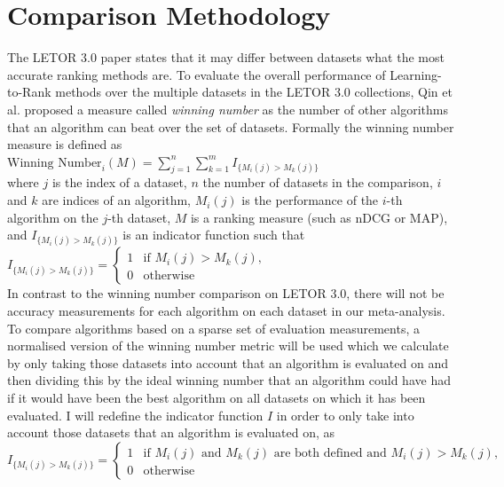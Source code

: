 \section{Comparison Methodology}
The LETOR 3.0 paper \cite{Qin2010} states that it may differ between datasets what the most accurate ranking methods are. To evaluate the overall performance of Learning-to-Rank methods over the multiple datasets in the LETOR 3.0 collections, Qin et al. \cite{Qin2010} proposed a measure called \emph{winning number} as the number of other algorithms that an algorithm can beat over the set of datasets. Formally the winning number measure is defined as\\

$\text{Winning Number}_i(M) = \sum\nolimits_{j=1}^n \sum\nolimits_{k=1}^m I_{\{M_i(j)>M_k(j)\}}$\\

where $j$ is the index of a dataset, $n$ the number of datasets in the comparison, $i$ and $k$ are indices of an algorithm, $M_i(j)$ is the performance of the $i$-th algorithm on the $j$-th dataset, $M$ is a ranking measure (such as \ac{nDCG} or \ac{MAP}), and $I_{\{M_i(j)>M_k(j)\}}$ is an indicator function such that\\

$I_{\{M_i(j)>M_k(j)\}} = \begin{cases}
1 & \text{if } M_i(j) > M_k(j), \\
0 & \text{otherwise}
\end{cases}$\\

In contrast to the winning number comparison on LETOR 3.0, there will not be accuracy measurements for each algorithm on each dataset in our meta-analysis. To compare algorithms based on a sparse set of evaluation measurements, a normalised version of the winning number metric will be used which we calculate by only taking those datasets into account that an algorithm is evaluated on and then dividing this by the ideal winning number that an algorithm could have had if it would have been the best algorithm on all datasets on which it has been evaluated. I will redefine the indicator function $I$ in order to only take into account those datasets that an algorithm is evaluated on, as \\

$I_{\{M_i(j)>M_k(j)\}} = \begin{cases}
1 & \text{if } M_i(j) \text{ and } M_k(j) \text{ are both defined and } M_i(j) > M_k(j), \\
0 & \text{otherwise}
\end{cases}$\\


